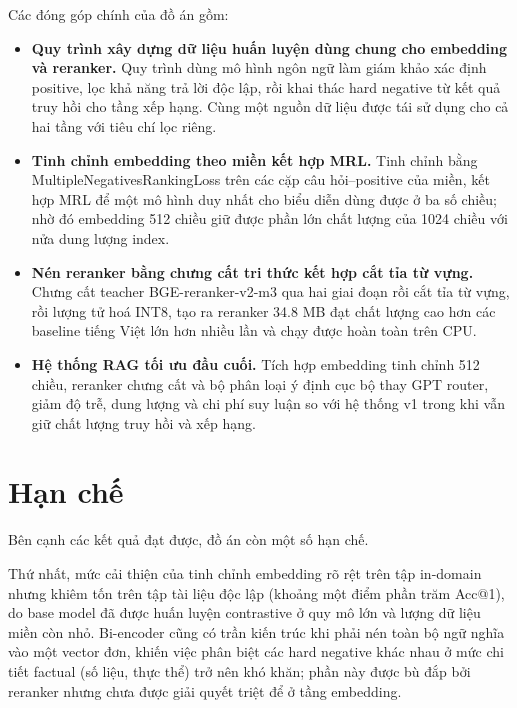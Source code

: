 \documentclass[../DoAn.tex]{subfiles}
\begin{document}
Các đóng góp chính của đồ án gồm:

\begin{itemize}
\item \textbf{Quy trình xây dựng dữ liệu huấn luyện dùng chung cho embedding và reranker.} Quy trình dùng mô hình ngôn ngữ làm giám khảo xác định positive, lọc khả năng trả lời độc lập, rồi khai thác hard negative từ kết quả truy hồi cho tầng xếp hạng. Cùng một nguồn dữ liệu được tái sử dụng cho cả hai tầng với tiêu chí lọc riêng.
\item \textbf{Tinh chỉnh embedding theo miền kết hợp MRL.} Tinh chỉnh bằng MultipleNegativesRankingLoss trên các cặp câu hỏi--positive của miền, kết hợp MRL để một mô hình duy nhất cho biểu diễn dùng được ở ba số chiều; nhờ đó embedding 512 chiều giữ được phần lớn chất lượng của 1024 chiều với nửa dung lượng index.
\item \textbf{Nén reranker bằng chưng cất tri thức kết hợp cắt tỉa từ vựng.} Chưng cất teacher BGE-reranker-v2-m3 qua hai giai đoạn rồi cắt tỉa từ vựng, rồi lượng tử hoá INT8, tạo ra reranker 34.8 MB đạt chất lượng cao hơn các baseline tiếng Việt lớn hơn nhiều lần và chạy được hoàn toàn trên CPU.
\item \textbf{Hệ thống RAG tối ưu đầu cuối.} Tích hợp embedding tinh chỉnh 512 chiều, reranker chưng cất và bộ phân loại ý định cục bộ thay GPT router, giảm độ trễ, dung lượng và chi phí suy luận so với hệ thống v1 trong khi vẫn giữ chất lượng truy hồi và xếp hạng.
\end{itemize}

\section{Hạn chế}
\label{section:5.3}

Bên cạnh các kết quả đạt được, đồ án còn một số hạn chế.

Thứ nhất, mức cải thiện của tinh chỉnh embedding rõ rệt trên tập in-domain nhưng khiêm tốn trên tập tài liệu độc lập (khoảng một điểm phần trăm Acc@1), do base model đã được huấn luyện contrastive ở quy mô lớn và lượng dữ liệu miền còn nhỏ. Bi-encoder cũng có trần kiến trúc khi phải nén toàn bộ ngữ nghĩa vào một vector đơn, khiến việc phân biệt các hard negative khác nhau ở mức chi tiết factual (số liệu, thực thể) trở nên khó khăn; phần này được bù đắp bởi reranker nhưng chưa được giải quyết triệt để ở tầng embedding.
\end{document}

